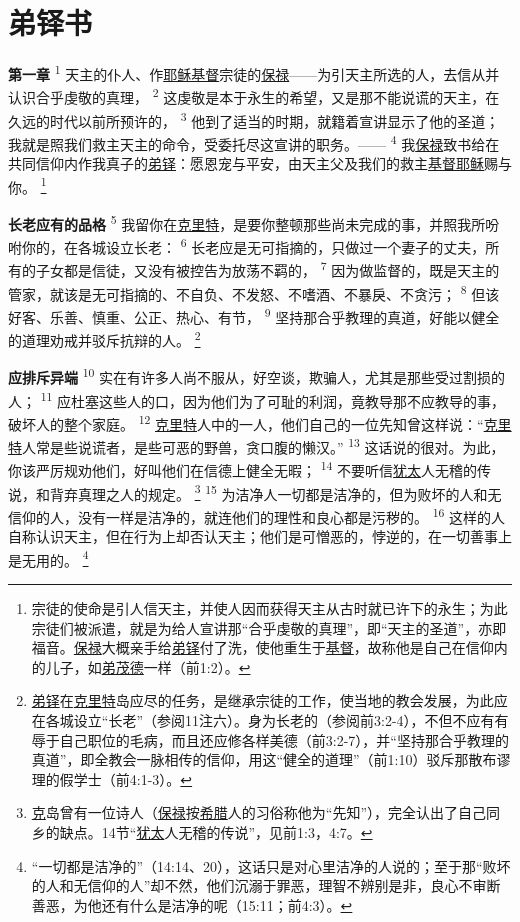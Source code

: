 \chapter*{弟铎书}


\textbf{第一章\quad}
\textsuperscript{1}
天主的仆人、作\uline{耶稣}\uline{基督}宗徒的\uline{保禄}——为引天主所选的人，去信从并认识合乎虔敬的真理，
\textsuperscript{2}
这虔敬是本于永生的希望，又是那不能说谎的天主，在久远的时代以前所预许的，
\textsuperscript{3}
他到了适当的时期，就籍着宣讲显示了他的圣道；我就是照我们救主天主的命令，受委托尽这宣讲的职务。——
\textsuperscript{4}
我\uline{保禄}致书给在共同信仰内作我真子的\uline{弟铎}：愿恩宠与平安，由天主父及我们的救主\uline{基督}\uline{耶稣}赐与你。
\renewcommand\thefootnote{\ding{\numexpr171+\value{footnote}}}
\footnote{宗徒的使命是引人信天主，并使人因而获得天主从古时就已许下的永生；为此宗徒们被派遣，就是为给人宣讲那“合乎虔敬的真理”，即“天主的圣道”，亦即福音。\uline{保禄}大概亲手给\uline{弟铎}付了洗，使他重生于\uline{基督}，故称他是自己在信仰内的儿子，如\uline{弟茂德}一样（前1:2）。}

\textbf{长老应有的品格\quad}
\textsuperscript{5}
我留你在\uline{克里特}，是要你整顿那些尚未完成的事，并照我所吩咐你的，在各城设立长老：
\textsuperscript{6}
长老应是无可指摘的，只做过一个妻子的丈夫，所有的子女都是信徒，又没有被控告为放荡不羁的，
\textsuperscript{7}
因为做监督的，既是天主的管家，就该是无可指摘的、不自负、不发怒、不嗜酒、不暴戾、不贪污；
\textsuperscript{8}
但该好客、乐善、慎重、公正、热心、有节，
\textsuperscript{9}
坚持那合乎教理的真道，好能以健全的道理劝戒并驳斥抗辩的人。
\footnote{\uline{弟铎}在\uline{克里特}岛应尽的任务，是继承宗徒的工作，使当地的教会发展，为此应在各城设立“长老”（参阅11注六）。身为长老的（参阅前3:2-4），不但不应有有辱于自己职位的毛病，而且还应修各样美德（前3:2-7），并“坚持那合乎教理的真道”，即全教会一脉相传的信仰，用这“健全的道理”（前1:10）驳斥那散布谬理的假学士（前4:1-3）。}

\textbf{应排斥异端\quad}
\textsuperscript{10}
实在有许多人尚不服从，好空谈，欺骗人，尤其是那些受过割损的人；
\textsuperscript{11}
应杜塞这些人的口，因为他们为了可耻的利润，竟教导那不应教导的事，破坏人的整个家庭。
\textsuperscript{12}
\uline{克里特}人中的一人，他们自己的一位先知曾这样说：“\uline{克里特}人常是些说谎者，是些可恶的野兽，贪口腹的懒汉。”
\textsuperscript{13}
这话说的很对。为此，你该严厉规劝他们，好叫他们在信德上健全无暇；
\textsuperscript{14}
不要听信\uline{犹太}人无稽的传说，和背弃真理之人的规定。
\footnote{\uline{克}岛曾有一位诗人（\uline{保禄}按\uline{希腊}人的习俗称他为“先知”），完全认出了自己同乡的缺点。14节“\uline{犹太}人无稽的传说”，见前1:3，4:7。}
\textsuperscript{15}
为洁净人一切都是洁净的，但为败坏的人和无信仰的人，没有一样是洁净的，就连他们的理性和良心都是污秽的。
\textsuperscript{16}
这样的人自称认识天主，但在行为上却否认天主；他们是可憎恶的，悖逆的，在一切善事上是无用的。
\footnote{“一切都是洁净的”（14:14、20），这话只是对心里洁净的人说的；至于那“败坏的人和无信仰的人”却不然，他们沉溺于罪恶，理智不辨别是非，良心不审断善恶，为他还有什么是洁净的呢（15:11；前4:3）。}

